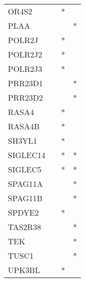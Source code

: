 \begin{longtable}{lccc}
OR4S2        &       &  * &         \\
PLAA         &       &    &       * \\
POLR2J       &       &  * &         \\
POLR2J2      &       &  * &         \\
POLR2J3      &       &  * &         \\
PRR23D1      &       &    &       * \\
PRR23D2      &       &    &       * \\
RASA4        &       &  * &         \\
RASA4B       &       &  * &         \\
SH3YL1       &       &  * &         \\
SIGLEC14     &       &  * &       * \\
SIGLEC5      &       &  * &       * \\
SPAG11A      &       &    &       * \\
SPAG11B      &       &    &       * \\
SPDYE2       &       &  * &         \\
TAS2R38      &       &    &       * \\
TEK          &       &    &       * \\
TUSC1        &       &    &       * \\
UPK3BL       &       &  * &         \\
\end{longtable}
